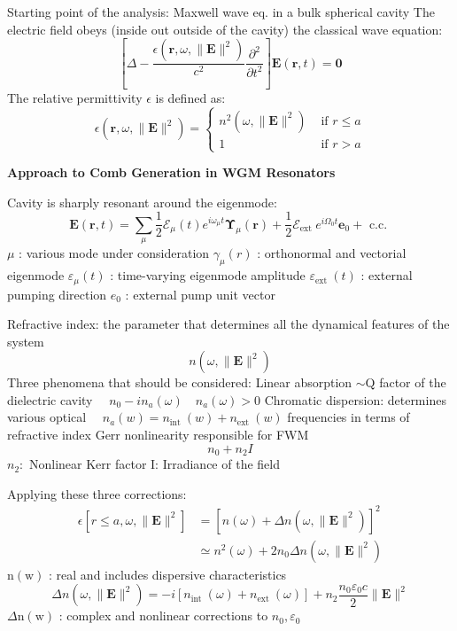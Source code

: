 \documentclass[main.tex]{subfiles}
\begin{document}
Starting point of the analysis: Maxwell wave eq. in a bulk spherical cavity The electric field obeys (inside out outside of the cavity) the classical wave equation:
$$
\left[\Delta-\frac{\epsilon\left(\mathbf{r}, \omega,\|\mathbf{E}\|^2\right)}{c^2} \frac{\partial^2}{\partial t^2}\right] \mathbf{E}(\mathbf{r}, t)=\mathbf{0}
$$
The relative permittivity $\epsilon$ is defined as:
$$
\epsilon\left(\mathbf{r}, \omega,\|\mathbf{E}\|^2\right)= \begin{cases}n^2\left(\omega,\|\mathbf{E}\|^2\right) & \text { if } r \leqslant a \\ 1 & \text { if } r>a\end{cases}
$$

\textbf{Approach to Comb Generation in WGM Resonators}

Cavity is sharply resonant around the eigenmode:
$$
\mathbf{E}(\mathbf{r}, t)=\sum_\mu \frac{1}{2} \mathcal{E}_\mu(t) e^{i \omega_\mu t} \boldsymbol{\Upsilon}_\mu(\mathbf{r})+\frac{1}{2} \mathcal{E}_{\text {ext }} e^{i \Omega_0 t} \mathbf{e}_0+\text { c.c. }
$$
$\mu$ : various mode under consideration
$\gamma_\mu(r)$ : orthonormal and vectorial eigenmode
$\varepsilon_\mu(t)$ : time-varying eigenmode amplitude
$\varepsilon_{\text {ext }}(t)$ : external pumping direction
$e_0$ : external pump unit vector

Refractive index: the parameter that determines all the dynamical features of the system
$$
n\left(\omega,\|\mathbf{E}\|^2\right)
$$
Three phenomena that should be considered:
Linear absorption $\sim \mathrm{Q}$ factor of the dielectric cavity $\quad n_0-i n_a(\omega) \quad n_a(\omega)>0$
Chromatic dispersion: determines various optical $\quad n_a(w)=n_{\text {int }}(w)+n_{\text {ext }}(w)$ frequencies in terms of refractive index
Gerr nonlinearity responsible for FWM
$$
n_0+n_2 I
$$
$n_2:$ Nonlinear Kerr factor I: Irradiance of the field

Applying these three corrections:
$$
\begin{aligned}
\epsilon\left[r \leqslant a, \omega,\|\mathbf{E}\|^2\right] &=\left[n(\omega)+\Delta n\left(\omega,\|\mathbf{E}\|^2\right)\right]^2 \\
& \simeq n^2(\omega)+2 n_0 \Delta n\left(\omega,\|\mathbf{E}\|^2\right)
\end{aligned}
$$
$\mathrm{n}(\mathrm{w})$ : real and includes dispersive characteristics
$$
\Delta n\left(\omega,\|\mathbf{E}\|^2\right)=-i\left[n_{\text {int }}(\omega)+n_{\text {ext }}(\omega)\right]+n_2 \frac{n_0 \varepsilon_0 c}{2}\|\mathbf{E}\|^2
$$
$\Delta \mathrm{n}(\mathrm{w})$ : complex and nonlinear corrections to $n_0, \varepsilon_0$
\end{document}
